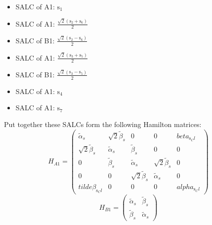 \documentclass[12pt,a4paper]{article}
\begin{document}
\begin{itemize}
\item SALC of A1: \quad $\text{s}_{1}$
\item SALC of A1: \quad $\frac{\sqrt{2} \left(\text{s}_{2} + \text{s}_{6}\right)}{2}$
\item SALC of B1: \quad $\frac{\sqrt{2} \left(\text{s}_{2} - \text{s}_{6}\right)}{2}$
\item SALC of A1: \quad $\frac{\sqrt{2} \left(\text{s}_{3} + \text{s}_{5}\right)}{2}$
\item SALC of B1: \quad $\frac{\sqrt{2} \left(\text{s}_{3} - \text{s}_{5}\right)}{2}$
\item SALC of A1: \quad $\text{s}_{4}$
\item SALC of A1: \quad $\text{s}_{7}$
\end{itemize}
Put together these SALCs form the following Hamilton matrices:
     $$ H_{A1}= \begin{pmatrix}\tilde{\alpha}_{s} & \sqrt{2} \tilde{\beta}_{s} & 0 & 0 & beta_{\text{s}_Cl}\\\sqrt{2} \tilde{\beta}_{s} & \tilde{\alpha}_{s} & \tilde{\beta}_{s} & 0 & 0\\0 & \tilde{\beta}_{s} & \tilde{\alpha}_{s} & \sqrt{2} \tilde{\beta}_{s} & 0\\0 & 0 & \sqrt{2} \tilde{\beta}_{s} & \tilde{\alpha}_{s} & 0\\tilde{\beta}_{\text{s}_Cl} & 0 & 0 & 0 & alpha_{\text{s}_Cl}\end{pmatrix}$$ 
     $$ H_{B1}= \begin{pmatrix}\tilde{\alpha}_{s} & \tilde{\beta}_{s}\\\tilde{\beta}_{s} & \tilde{\alpha}_{s}\end{pmatrix}$$ 
\end{document}
